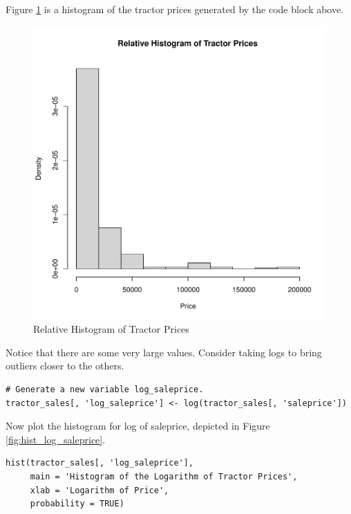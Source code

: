 \documentclass[11pt]{book}
\begin{document}
Figure \ref{fig:hist_saleprice} is
a histogram of the tractor prices
generated by the code block above.
%
\begin{figure}[h!]
  \centering
  \includegraphics[scale = 0.5, keepaspectratio=true]{../Figures/hist_saleprice}
  \caption{Relative Histogram of Tractor Prices} \label{fig:hist_saleprice}
\end{figure}
%
%
Notice that there are some very large values.
Consider taking logs to bring outliers closer to the others.

\begin{verbatim}
# Generate a new variable log_saleprice.
tractor_sales[, 'log_saleprice'] <- log(tractor_sales[, 'saleprice'])
\end{verbatim}

Now plot the histogram for log of saleprice,
depicted in Figure \ref{fig:hist_log_saleprice}.

\begin{verbatim}
hist(tractor_sales[, 'log_saleprice'],
     main = 'Histogram of the Logarithm of Tractor Prices',
     xlab = 'Logarithm of Price',
     probability = TRUE)
\end{verbatim}
\end{document}

